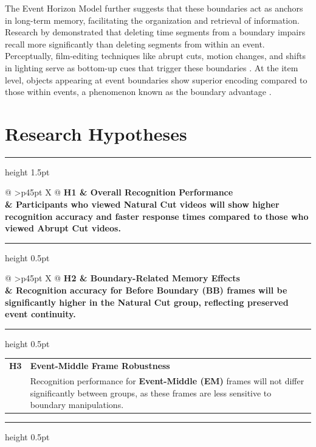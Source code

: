 \documentclass[11pt, a4paper]{article}
\begin{document}
The Event Horizon Model \citep{radvansky2017event} further suggests that these boundaries act as anchors in long-term memory, facilitating the organization and retrieval of information. Research by \citet{schwan2004discontinuities} demonstrated that deleting time segments from a boundary impairs recall more significantly than deleting segments from within an event. Perceptually, film-editing techniques like abrupt cuts, motion changes, and shifts in lighting serve as bottom-up cues that trigger these boundaries \citep{cutting2012hollywood}. At the item level, objects appearing at event boundaries show superior encoding compared to those within events, a phenomenon known as the boundary advantage \citep{swallow2009operation}.

\section{Research Hypotheses}

\newcommand{\hypothesis}[3]{%
  \par\noindent
  \begin{tabularx}{\linewidth}{@{} >{\raggedleft\arraybackslash}p{45pt} X @{}}
    \small\sffamily\bfseries\textcolor{accent}{#1} & 
    \small\bfseries\textcolor{accent}{#2} \\
    & \small #3
  \end{tabularx}
  \par\vspace{8pt}
  {\color{accentlight}\hrule height 0.5pt}
  \vspace{10pt}
}

{\color{accent}\hrule height 1.5pt}
\vspace{12pt}

\hypothesis{H1}{Overall Recognition Performance}{%
  Participants who viewed \textbf{Natural Cut} videos will show higher recognition accuracy and faster response times compared to those who viewed \textbf{Abrupt Cut} videos.}

\hypothesis{H2}{Boundary-Related Memory Effects}{%
  Recognition accuracy for \textbf{Before Boundary (BB)} frames will be significantly higher in the Natural Cut group, reflecting preserved event continuity.}

\hypothesis{H3}{Event-Middle Frame Robustness}{%
  Recognition performance for \textbf{Event-Middle (EM)} frames will not differ significantly between groups, as these frames are less sensitive to boundary manipulations.}
\end{document}
